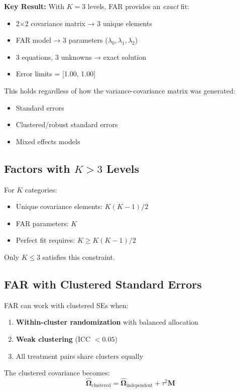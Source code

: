 \documentclass[11pt]{article}
\begin{document}
\textbf{Key Result:} With $K = 3$ levels, FAR provides an \textit{exact} fit:

\begin{itemize}
    \item 2×2 covariance matrix → 3 unique elements
    \item FAR model → 3 parameters ($\lambda_0, \lambda_1, \lambda_2$)
    \item 3 equations, 3 unknowns → exact solution
    \item Error limits = [1.00, 1.00]
\end{itemize}

This holds regardless of how the variance-covariance matrix was generated:
\begin{itemize}
    \item Standard errors
    \item Clustered/robust standard errors
    \item Mixed effects models
\end{itemize}

\subsection{Factors with $K > 3$ Levels}

For $K$ categories:
\begin{itemize}
    \item Unique covariance elements: $K(K-1)/2$
    \item FAR parameters: $K$
    \item Perfect fit requires: $K \geq K(K-1)/2$
\end{itemize}

Only $K \leq 3$ satisfies this constraint.

\subsection{FAR with Clustered Standard Errors}

FAR can work with clustered SEs when:
\begin{enumerate}
    \item \textbf{Within-cluster randomization} with balanced allocation
    \item \textbf{Weak clustering} (ICC $< 0.05$)
    \item All treatment pairs share clusters equally
\end{enumerate}

The clustered covariance becomes:
\begin{equation}
    \hat{\boldsymbol{\Omega}}_{\text{clustered}} = \hat{\boldsymbol{\Omega}}_{\text{independent}} + \tau^2 \mathbf{M}
\end{equation}
\end{document}
